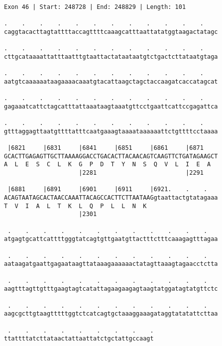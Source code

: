 \documentclass{article}
\begin{document}
\newpage
\begin{Verbatim}
Exon 46 | Start: 248728 | End: 248829 | Length: 101
 
.    .    .    .    .    .    .    .    .    .    .    .    
caggtacacttagtattttaccagttttcaaagcatttaattatatggtaagactatagc
  
.    .    .    .    .    .    .    .    .    .    .    .    
cttgcataaaattatttaatttgtaattactataataatgtctgactcttataatgtaga
  
.    .    .    .    .    .    .    .    .    .    .    .    
aatgtcaaaaaataagaaaacaaatgtacattaagctagctaccaagatcaccatagcat
  
.    .    .    .    .    .    .    .    .    .    .    .    
gagaaatcattctagcatttattaaataagtaaatgttcctgaattcattccgagattca
  
.    .    .    .    .    .    .    .    .    .    .    .    
gtttaggagttaatgttttatttcaatgaaagtaaaataaaaaattctgttttcctaaaa
  
 |6821     |6831     |6841     |6851     |6861     |6871    
GCACTTGAGAGTTGCTTAAAAGGACCTGACACTTACAACAGTCAAGTTCTGATAGAAGCT
A  L  E  S  C  L  K  G  P  D  T  Y  N  S  Q  V  L  I  E  A  
                     |2281                         |2291    
  
 |6881     |6891     |6901     |6911     |6921.    .    .   
ACAGTAATAGCACTAACCAAATTACAGCCACTTCTTAATAAGgtaattactgtatagaaa
T  V  I  A  L  T  K  L  Q  P  L  L  N  K                    
                     |2301                                  
  
 .    .    .    .    .    .    .    .    .    .    .    .   
atgagtgcattcattttgggtatcagtgttgaatgttactttctttcaaagagtttagaa
  
 .    .    .    .    .    .    .    .    .    .    .    .   
aataagatgaattgagaataagttataaagaaaaaactatagttaaagtagaacctctta
  
 .    .    .    .    .    .    .    .    .    .    .    .   
aagtttagttgtttgaagtagtcatattagaagaagagtaagtatggatagtatgttctc
  
 .    .    .    .    .    .    .    .    .    .    .    .   
aagcgcttgtaagtttttggtctcatcagtgctaaaggaaagataggtatatattcttaa
  
 .    .    .    .    .    .    .    .    .
ttattttatcttataactattaattatctgctattgccaagt
\end{Verbatim}
\newpage
\end{document}
